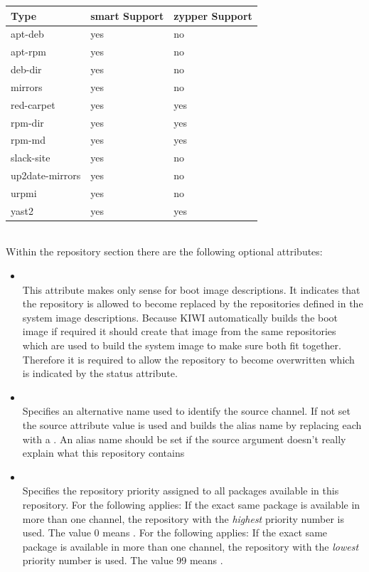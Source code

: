 \begin{tabular}[h]{|p{4cm}|p{3cm}|p{3cm}|}
\hline
\textbf{Type} & \textbf{smart Support} & \textbf{zypper Support}\\
\hline
apt-deb            & yes & no  \\
apt-rpm            & yes & no  \\
deb-dir            & yes & no  \\
mirrors            & yes & no  \\
red-carpet         & yes & yes \\
rpm-dir            & yes & yes \\
rpm-md             & yes & yes \\ 
slack-site         & yes & no  \\
up2date-mirrors    & yes & no  \\
urpmi              & yes & no  \\
yast2              & yes & yes \\
\hline
\end{tabular}\\

Within the repository section there are the following optional
attributes:

\begin{itemize}
\item {}\\
      This attribute makes only sense for boot image descriptions.
      It indicates that the repository is allowed to become replaced by
      the repositories defined in the system image descriptions. Because KIWI
      automatically builds the boot image if required it should create that
      image from the same repositories which are used to build the system
      image to make sure both fit together. Therefore it is required to allow
      the repository to become overwritten which is indicated by the status
      attribute.
\item {}\\
      Specifies an alternative name used to identify the source channel.
      If not set the source attribute value is used and builds the alias name
      by replacing each \kquote{/} with a \kquote{\_}. An alias name should be set if
      the source argument doesn't really explain what this repository
      contains 
\item {}\\
      Specifies the repository priority assigned to all packages available in
      this repository. For  the following applies: If the
      exact same package is available in more than one channel, the repository
      with the \emph{highest} priority number is used. The value 0 means
      . For  the following applies:
      If the exact same package is available in more than one channel, the
      repository with the \emph{lowest} priority number is used. The value
      99 means .
\end{itemize}

